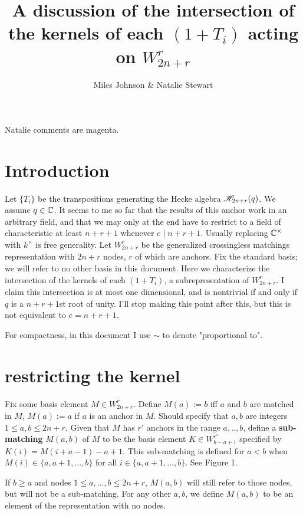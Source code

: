 \documentclass{amsart}
\begin{document}
	
\title{A discussion of the intersection of the kernels of each $(1+T_i)$ acting on $W_{2n+r}^r$}
\author{Miles Johnson \& Natalie Stewart}

\maketitle

{\color{magenta} Natalie comments are magenta.}

\section{Introduction} 

Let $\{T_i\}$ be the transpositions generating the Hecke algebra $\mathscr{H}_{2n+r}(q)$. We assume $q\in \mathbb{C}$.
{\color{magenta} It seems to me so far that the results of this anchor work in an arbitrary field, and that we may only at the end have to restrict to a field of characteristic at least $n + r + 1$ whenever $e \mid n + r + 1$.
Usually replacing $\mathbb{C}^\times$ with $k^\times$ is free generality.
}
Let $W_{2n+r}^r$ be the generalized crossingless matchings representation with $2n+r$ nodes, $r$ of which are anchors. Fix the standard basis; we will refer to no other basis in this document. Here we characterize the intersection of the kernels of each $(1+T_i)$, a subrepresentation of $W_{2n+r}^r$. I claim this intersection is at most one dimensional, and is nontrivial if and only if $q$ is a $n+r+1$st root of unity.
{\color{magenta} I'll stop making this point after this, but this is not equivalent to $e = n + r + 1$.}

For compactness, in this document I use $\sim $ to denote "proportional to".

 \section{restricting the kernel}


\begin{definition}
	
  Fix some basis element $M\in W_{2n+r}^r$. Define $M(a):=b$ iff $a$ and $b$ are matched in $M$, $M(a):=a$ if $a$ is an anchor in $M$.
  {\color{magenta} Should specify that $a,b$ are integers $1 \leq a,b \leq 2n + r$.} 
  Given that $M$ has $r'$ anchors in the range $a,..,b$, define a \textbf{sub-matching} $M(a,b)$ of $M$ to be the basis element $K\in W_{b-a+1}^{r'}$ specified by $K(i)=M(i+a-1)-a+1$. This sub-matching is defined for $a<b$ when $M(i)\in \{a,a+1,...,b\}$ for all $i\in \{a,a+1,...,b\}$. See Figure 1.
  
  If $b\geq a$ and nodes $1\leq a,...,b\leq 2n+r$, $M(a,b)$ will still refer to those nodes, but will not be a sub-matching. For any other $a,b$, we define $M(a,b)$ to be an element of the representation with no nodes.
\end{definition}
\end{document}

